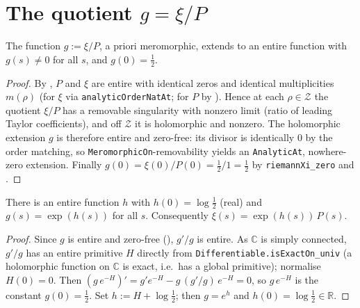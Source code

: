 \section{The quotient \texorpdfstring{$g=\xi/P$}{g=xi/P}}
\label{sec:hf_quot}

\begin{lemma}
\label{lem:hf_quot}
\leanok
{}
The function $g:=\xi/P$, a priori meromorphic, extends to an entire function with
$g(s)\neq0$ for all $s$, and $g(0)=\tfrac12$.
\end{lemma}

\begin{proof}
\leanok
{}
By , $P$ and $\xi$ are entire with identical zeros and
identical multiplicities $m(\rho)$ (for $\xi$ via
\texttt{analyticOrderNatAt}; for $P$ by ). Hence at each
$\rho\in\mathcal Z$ the quotient $\xi/P$ has a removable singularity with nonzero
limit (ratio of leading Taylor coefficients), and off $\mathcal Z$ it is holomorphic
and nonzero. The holomorphic extension $g$ is therefore entire and zero-free: its
divisor is identically $0$ by the order matching, so
\texttt{MeromorphicOn}-removability yields an \texttt{AnalyticAt}, nowhere-zero
extension. Finally $g(0)=\xi(0)/P(0)=\tfrac12/1=\tfrac12$ by
\texttt{riemannXi\_zero} and .
\end{proof}

\begin{lemma}
\label{lem:hf_eq_exp}
\leanok
{}
There is an entire function $h$ with $h(0)=\log\tfrac12$ (real) and
$g(s)=\exp(h(s))$ for all $s$. Consequently $\xi(s)=\exp(h(s))\,P(s)$.
\end{lemma}

\begin{proof}
\leanok
{}
Since $g$ is entire and zero-free (), $g'/g$ is entire. As
$\mathbb C$ is simply connected, $g'/g$ has an entire primitive $H$ directly from
\texttt{Differentiable.isExactOn\_univ} (a holomorphic function on $\mathbb C$ is
exact, i.e.\ has a global primitive); normalise $H(0)=0$. Then
$(g\,e^{-H})'=g'e^{-H}-g\,(g'/g)\,e^{-H}=0$, so $g\,e^{-H}$ is the constant
$g(0)=\tfrac12$. Set $h:=H+\log\tfrac12$; then $g=e^{h}$ and
$h(0)=\log\tfrac12\in\mathbb R$.
\end{proof}

